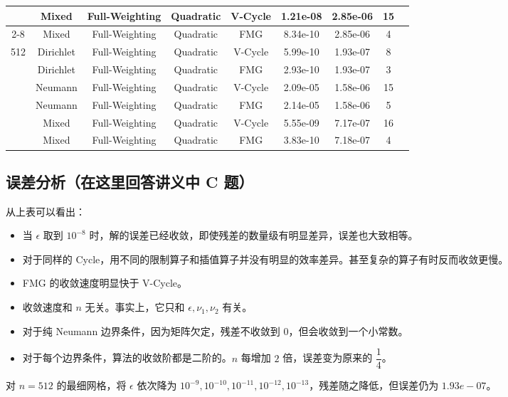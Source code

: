 \documentclass{ctexart}
\begin{document}
\begin{longtable}{ccccccccc}
\multirow{6}{*}{}		& Mixed		& Full-Weighting	& Quadratic	& V-Cycle	& 1.21e-08	& 2.85e-06	& 15	\\ \cline{2-8}
\multirow{6}{*}{}		& Mixed		& Full-Weighting	& Quadratic	& FMG		& 8.34e-10	& 2.85e-06	& 4		\\ \hline
\multirow{6}{*}{512}	& Dirichlet	& Full-Weighting	& Quadratic	& V-Cycle	& 5.99e-10	& 1.93e-07	& 8		\\ \cline{2-8}
\multirow{6}{*}{}		& Dirichlet	& Full-Weighting	& Quadratic	& FMG		& 2.93e-10	& 1.93e-07	& 3		\\ \cline{2-8}
\multirow{6}{*}{}		& Neumann	& Full-Weighting	& Quadratic	& V-Cycle	& 2.09e-05	& 1.58e-06	& 15	\\ \cline{2-8}
\multirow{6}{*}{}		& Neumann	& Full-Weighting	& Quadratic	& FMG		& 2.14e-05	& 1.58e-06	& 5		\\ \cline{2-8}
\multirow{6}{*}{}		& Mixed		& Full-Weighting	& Quadratic	& V-Cycle	& 5.55e-09	& 7.17e-07	& 16	\\ \cline{2-8}
\multirow{6}{*}{}		& Mixed		& Full-Weighting	& Quadratic	& FMG		& 3.83e-10	& 7.18e-07	& 4		\\ \hline


\end{longtable}

\subsection{误差分析（在这里回答讲义中 C 题）}

从上表可以看出：

\begin{itemize}
	\item 当 $\epsilon$ 取到 $10^{-8}$ 时，解的误差已经收敛，即使残差的数量级有明显差异，误差也大致相等。
	\item 对于同样的 Cycle，用不同的限制算子和插值算子并没有明显的效率差异。甚至复杂的算子有时反而收敛更慢。
	\item FMG 的收敛速度明显快于 V-Cycle。
	\item 收敛速度和 $n$ 无关。事实上，它只和 $\epsilon,\nu_1,\nu_2$ 有关。
	\item 对于纯 Neumann 边界条件，因为矩阵欠定，残差不收敛到 $0$，但会收敛到一个小常数。
	\item 对于每个边界条件，算法的收敛阶都是二阶的。$n$ 每增加 $2$ 倍，误差变为原来的 $\dfrac 14$。
\end{itemize}

对 $n=512$ 的最细网格，将 $\epsilon$ 依次降为 $10^{-9},10^{-10},10^{-11},10^{-12},10^{-13}$，残差随之降低，但误差仍为 $1.93e-07$。
\end{document}
